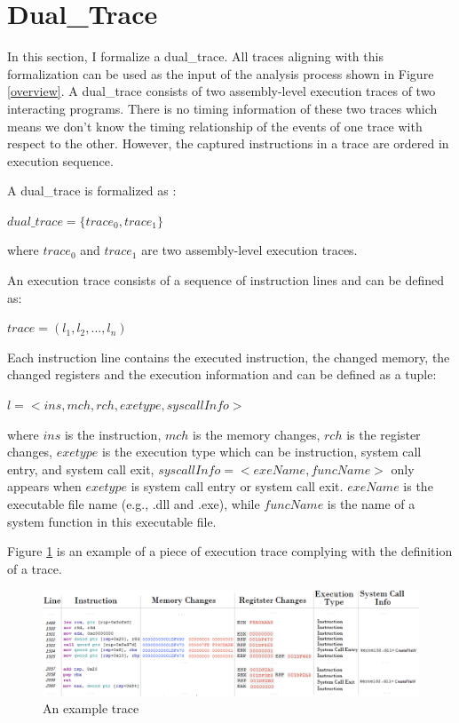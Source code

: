 \section{Dual\_Trace}\label{dualtrace}
In this section, I formalize a dual\_trace. All traces aligning with this formalization can be used as the input of the analysis process shown in Figure \ref{overview}. A dual\_trace consists of two assembly-level execution traces of two interacting programs. There is no timing information of these two traces which means we don't know the timing relationship of the events of one trace with respect to the other. However, the captured instructions in a trace are ordered in execution sequence. 

A dual\_trace is formalized as :

$dual\_trace = \lbrace trace_0, trace_1\rbrace$

where $trace_0$ and $trace_1$ are two assembly-level execution traces.

An execution trace consists of a sequence of instruction lines and can be defined as: 

$ trace = (l_1, l_2, ..., l_n)$ 

Each instruction line contains the executed instruction, the changed memory, the changed registers and the execution information and can be defined as a tuple:

$l = <ins, mch, rch, exetype, syscallInfo>$

where $ins$ is the instruction, $mch$ is the memory changes, $rch$ is the register changes, $exetype$ is the execution type which can be instruction, system call entry, and system call exit, $syscallInfo = <exeName, funcName>$ only appears when $exetype$ is system call entry or system call exit. $exeName$ is the executable file name (e.g., .dll and .exe), while $funcName$ is the name of a system function in this executable file.

Figure \ref{tracedefined} is an example of a piece of execution trace complying with the definition of a trace. 

\begin{figure}[H]
\centerline{\includegraphics[scale=0.5]{Figures/tracedefined}}
\caption{An example trace }
\label{tracedefined}
\end{figure}



